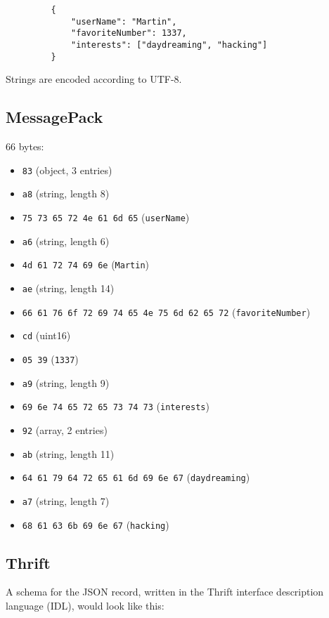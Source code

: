 \documentclass[12pt, titlepage]{article}
\begin{document}
\begin{verbatim}
         {
             "userName": "Martin",
             "favoriteNumber": 1337,
             "interests": ["daydreaming", "hacking"]
         }
\end{verbatim}

Strings are encoded according to UTF-8.

\subsection{MessagePack}

66 bytes:

\begin{itemize}
    \item \texttt{83} (object, 3 entries)
    \item \texttt{a8} (string, length 8)
    \item \texttt{75 73 65 72 4e 61 6d 65} (\texttt{userName})
    \item \texttt{a6} (string, length 6)
    \item \texttt{4d 61 72 74 69 6e} (\texttt{Martin})
    \item \texttt{ae} (string, length 14)
    \item \texttt{66 61 76 6f 72 69 74 65 4e 75 6d 62 65 72} (\texttt{favoriteNumber})
    \item \texttt{cd} (uint16)
    \item \texttt{05 39} (\texttt{1337})
    \item \texttt{a9} (string, length 9)
    \item \texttt{69 6e 74 65 72 65 73 74 73} (\texttt{interests})
    \item \texttt{92} (array, 2 entries)
    \item \texttt{ab} (string, length 11)
    \item \texttt{64 61 79 64 72 65 61 6d 69 6e 67} (\texttt{daydreaming})
    \item \texttt{a7} (string, length 7)
    \item \texttt{68 61 63 6b 69 6e 67} (\texttt{hacking})
\end{itemize}

\subsection{Thrift}

A schema for the JSON record, written in the Thrift interface description language (IDL), would look like this:
\end{document}
